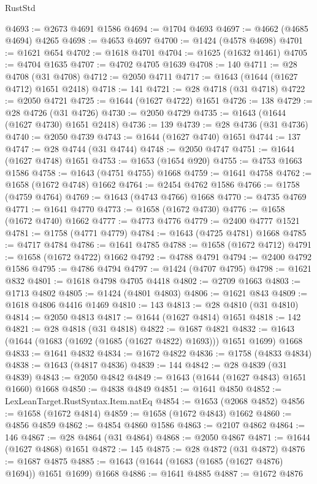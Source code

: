 \begin{lexlean}{RustStd}
\begin{coremodule}
@4693 := @2673 @4691 @1586
@4694 := @1704 @4693
@4697 := @4662 (@4685 @4694) @4265
@4698 := @4653 @4697
@4700 := @1424 (@4578 @4698)
@4701 := @1621 @654
@4702 := @1618 @4701
@4704 := @1625 (@1632 @1461)
@4705 := @4704 @1635
@4707 := @4702 @4705 @1639
@4708 := 140
@4711 := @28 @4708 (@31 @4708)
@4712 := @2050 @4711
@4717 := @1643 (@1644 (@1627 @4712) @1651 @2418)
@4718 := 141
@4721 := @28 @4718 (@31 @4718)
@4722 := @2050 @4721
@4725 := @1644 (@1627 @4722) @1651
@4726 := 138
@4729 := @28 @4726 (@31 @4726)
@4730 := @2050 @4729
@4735 := @1643 (@1644 (@1627 @4730) @1651 @2418)
@4736 := 139
@4739 := @28 @4736 (@31 @4736)
@4740 := @2050 @4739
@4743 := @1644 (@1627 @4740) @1651
@4744 := 137
@4747 := @28 @4744 (@31 @4744)
@4748 := @2050 @4747
@4751 := @1644 (@1627 @4748) @1651
@4753 := @1653 (@1654 @920)
@4755 := @4753 @1663 @1586
@4758 := @1643 (@4751 @4755) @1668
@4759 := @1641 @4758
@4762 := @1658 (@1672 @4748) @1662
@4764 := @2454 @4762 @1586
@4766 := @1758 (@4759 @4764)
@4769 := @1643 (@4743 @4766) @1668
@4770 := @4735 @4769
@4771 := @1641 @4770
@4773 := @1658 (@1672 @4730)
@4776 := @1658 (@1672 @4740) @1662
@4777 := @4773 @4776
@4779 := @2400 @4777 @1521
@4781 := @1758 (@4771 @4779)
@4784 := @1643 (@4725 @4781) @1668
@4785 := @4717 @4784
@4786 := @1641 @4785
@4788 := @1658 (@1672 @4712)
@4791 := @1658 (@1672 @4722) @1662
@4792 := @4788 @4791
@4794 := @2400 @4792 @1586
@4795 := @4786 @4794
@4797 := @1424 (@4707 @4795)
@4798 := @1621 @832
@4801 := @1618 @4798 @4705 @4418
@4802 := @2709 @1663
@4803 := @1713 @4802
@4805 := @1424 (@4801 @4803)
@4806 := @1621 @843
@4809 := @1618 @4806 @4416 @1469
@4810 := 143
@4813 := @28 @4810 (@31 @4810)
@4814 := @2050 @4813
@4817 := @1644 (@1627 @4814) @1651
@4818 := 142
@4821 := @28 @4818 (@31 @4818)
@4822 := @1687 @4821
@4832 := @1643 (@1644 (@1683 (@1692 (@1685 (@1627 @4822) @1693))) @1651 @1699) @1668
@4833 := @1641 @4832
@4834 := @1672 @4822
@4836 := @1758 (@4833 @4834)
@4838 := @1643 (@4817 @4836)
@4839 := 144
@4842 := @28 @4839 (@31 @4839)
@4843 := @2050 @4842
@4849 := @1643 (@1644 (@1627 @4843) @1651 @1660) @1668
@4850 := @4838 @4849
@4851 := @1641 @4850
@4852 := LexLeanTarget.RustSyntax.Item.natEq
@4854 := @1653 (@2068 @4852)
@4856 := @1658 (@1672 @4814)
@4859 := @1658 (@1672 @4843) @1662
@4860 := @4856 @4859
@4862 := @4854 @4860 @1586
@4863 := @2107 @4862
@4864 := 146
@4867 := @28 @4864 (@31 @4864)
@4868 := @2050 @4867
@4871 := @1644 (@1627 @4868) @1651
@4872 := 145
@4875 := @28 @4872 (@31 @4872)
@4876 := @1687 @4875
@4885 := @1643 (@1644 (@1683 (@1685 (@1627 @4876) @1694)) @1651 @1699) @1668
@4886 := @1641 @4885
@4887 := @1672 @4876

\end{coremodule}
\end{lexlean}
